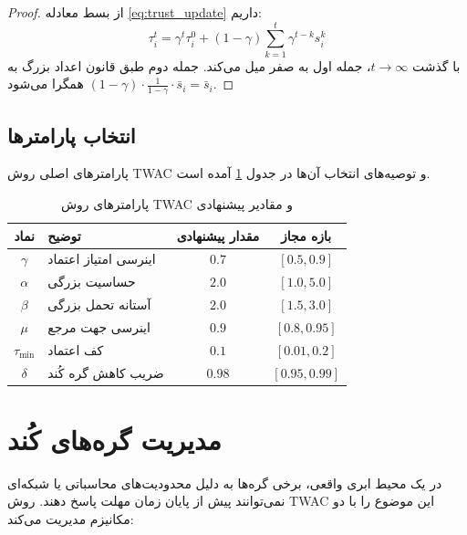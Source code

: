 \begin{proof}
    از بسط معادله \eqref{eq:trust_update} داریم:
    \begin{equation*}
        \tau_i^t = \gamma^t \tau_i^0 + (1-\gamma) \sum_{k=1}^{t} \gamma^{t-k} s_i^k
    \end{equation*}
    با گذشت $t \to \infty$، جمله اول به صفر میل می‌کند. جمله دوم طبق قانون اعداد بزرگ به $(1-\gamma) \cdot \frac{1}{1-\gamma} \cdot \bar{s}_i = \bar{s}_i$ همگرا می‌شود.
\end{proof}

\subsection{انتخاب پارامترها}

پارامترهای اصلی روش \gls{TWAC} و توصیه‌های انتخاب آن‌ها در جدول \ref{tab:hyperparams} آمده است.

\begin{table}[t]
    \centering
    \renewcommand{\arraystretch}{1.8}
    \caption{پارامترهای روش \gls{TWAC} و مقادیر پیشنهادی}
    \label{tab:hyperparams}
    \begin{tabular}{clcc}
        \toprule
        \textbf{نماد} & \textbf{توضیح} & \textbf{مقدار پیشنهادی} & \textbf{بازه مجاز} \\
        \midrule
        $\gamma$ & اینرسی امتیاز اعتماد & $0.7$ & $[0.5, 0.9]$ \\
        $\alpha$ & حساسیت بزرگی & $2.0$ & $[1.0, 5.0]$ \\
        $\beta$ & آستانه تحمل بزرگی & $2.0$ & $[1.5, 3.0]$ \\
        $\mu$ & اینرسی جهت مرجع & $0.9$ & $[0.8, 0.95]$ \\
        $\tau_{\min}$ & کف اعتماد & $0.1$ & $[0.01, 0.2]$ \\
        $\delta$ & ضریب کاهش گره کُند & $0.98$ & $[0.95, 0.99]$ \\
        \bottomrule
    \end{tabular}
\end{table}


\section{مدیریت گره‌های کُند}
\label{sec:straggler_handling}

در یک محیط ابری واقعی، برخی گره‌ها به دلیل محدودیت‌های محاسباتی یا شبکه‌ای نمی‌توانند پیش از پایان زمان مهلت پاسخ دهند. روش \gls{TWAC} این موضوع را با دو مکانیزم مدیریت می‌کند:

